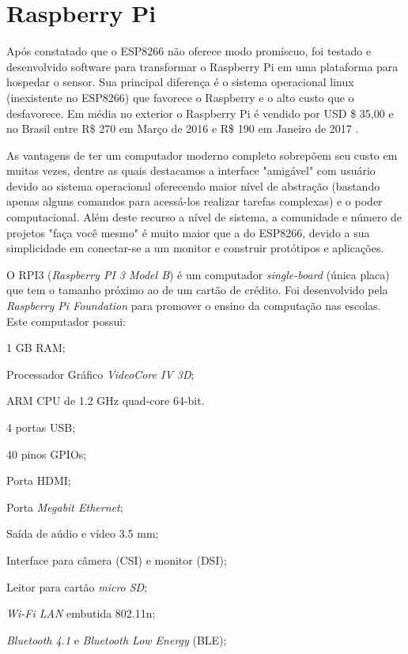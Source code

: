 
\section{Raspberry Pi}
\label{sec:Raspberry-Pi}

Após constatado que o ESP8266 não oferece modo promíscuo, foi testado e
desenvolvido software para transformar o Raspberry Pi em uma plataforma para
hospedar o sensor. Sua principal diferença é o sistema operacional linux
(inexistente no ESP8266) que favorece o Raspberry e o alto custo que o
desfavorece. Em média no exterior o Raspberry Pi é vendido por USD \$ 35,00
\cite{RPI2016} e no Brasil entre R\$ 270 em Março de 2016 e R\$ 190 em Janeiro
de 2017 \cite{rpi3-mercadolivre}.

As vantagens de ter um computador moderno completo sobrepõem seu custo em muitas
vezes, dentre as quais destacamos a interface "amigável" com usuário devido ao
sistema operacional oferecendo maior nível de abstração (bastando apenas alguns
comandos para acessá-los realizar tarefas complexas) e o poder computacional.
Além deste recurso a nível de sistema, a comunidade e número de projetos "faça
você mesmo" é muito maior que a do ESP8266, devido a sua simplicidade em
conectar-se a um monitor e construir protótipos e aplicações.

O RPI3 (\emph{Raspberry PI 3 Model B}) é um computador \emph{single-board}  (única
placa) que tem o tamanho próximo ao de um cartão de crédito. Foi desenvolvido
pela \emph{Raspberry Pi Foundation} para promover o ensino da computação nas
escolas. Este computador possui:


\begin{alineas}
	\item 1 GB RAM;

	\item Processador Gráfico \emph{VideoCore IV 3D};

	\item ARM CPU de 1.2 GHz quad-core 64-bit.

	\item 4 portas USB;

	\item 40 pinos GPIOs;

	\item Porta HDMI;

	\item Porta \emph{Megabit Ethernet};

	\item Saída de aúdio e vídeo 3.5 mm;

	\item Interface para câmera (CSI) e monitor (DSI);

	\item Leitor para cartão \emph{micro SD};

	\item \emph{Wi-Fi LAN} embutida 802.11n;

	\item \emph{Bluetooth 4.1} e \emph{Bluetooth Low Energy} (BLE);

\end{alineas}

